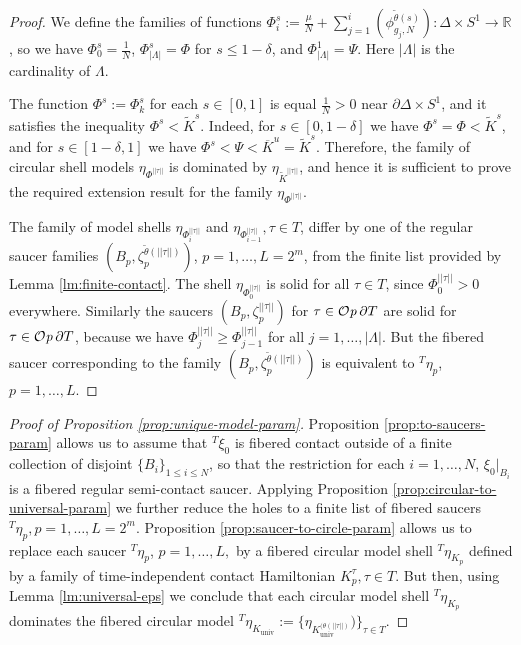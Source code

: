 \documentclass[12pt]{paper}
\theoremstyle{plain}
\theoremstyle{definition}
\newcommand{\wt}{\widetilde}
\newcommand{\ol}{\overline}
\newcommand{\p}{\partial}
\newcommand{\R}{{\mathbb{R}}}
\newcommand{\univ}{\mathrm{univ}}
\def\Op{{\mathcal O}{\it p}\,}
\numberwithin{figure}{section}
\begin{document}
\begin{proof}
  We define the families of  functions $\Phi^s_i:= \frac\mu N+ 
  \sum\limits_{j=1}^i \left( \phi^{\wt{\theta}(s)}_{g_j,N}\right):\Delta\times S^1\to\R$, 
  so we have $\Phi^s_0=\frac1N$, $\Phi^s_{|\Lambda|}=\Phi$ for $s\leq 1-\delta$, and $\Phi^1_{|\Lambda|}=\Psi$. Here ${|\Lambda|}$ is the cardinality of $\Lambda$.

 The function  $\Phi^s:=\Phi^s_k$ for each $s\in[0,1]$ is equal $\frac1N>0$ near $  \p \Delta\times S^1$, and 
it satisfies the inequality $\Phi^s<\wt K^s$. Indeed, for $s\in[0,1-\delta]$ we have  $\Phi^s=\Phi<\wt K^s$, and for $s\in[1-\delta,1]$ we have
$\Phi^s<\Psi<\ol K^u=\wt K^s$.
Therefore, the  family of circular shell models $\eta_{\Phi^{||\tau||}}$  is dominated by $\eta_{\wt K^{||\tau||}}$, and hence it is sufficient to prove the required extension result for the family $\eta_{\Phi^{||\tau||}}$.  

The family of   model shells $\eta_{\Phi^{||\tau||}_i}$ and 
 $\eta_{\Phi^{||\tau||}_{i-1}}, \tau\in T$, differ by one of  the regular saucer families    $(B_p,\zeta^{\wt\theta(||\tau||)}_p)$, $p=1,\dots, L=2^m$, from the finite list provided by Lemma \ref{lm:finite-contact}.   The   shell $\eta_{\Phi^{||\tau||}_0}$ is solid  for all $\tau\in T$, since $\Phi^{||\tau||}_0>0$ everywhere. Similarly the saucers  $(B_p,\zeta^{||\tau||}_p)$
 for $\tau\in\Op\p T$ are solid   for $\tau\in\Op\p T$, because we have  $\Phi^{||\tau||}_j\geq\Phi^{||\tau||}_{j-1}$ for all $j=1,\dots, |\Lambda|$.  
But the fibered saucer  corresponding to the family  $(B_p,\zeta^{\wt\theta(||\tau||)}_p)$ is equivalent to  ${}^T\eta_p$, $p=1,\dots, L$.
    \end{proof}

   
   \medskip
  
   \begin{proof}[Proof of Proposition \ref{prop:unique-model-param}]
 Proposition  \ref{prop:to-saucers-param}  allows us to   assume that ${}^T\xi_0$ is fibered  contact outside of a finite collection of disjoint    $\{B_i\}_{1\leq i\leq N}$, so that the restriction  for each $i=1,\dots, N$, $\xi_0|_{B_i}$ is a fibered  regular semi-contact saucer. Applying
Proposition \ref{prop:circular-to-universal-param} we further reduce the holes to a finite list of fibered saucers ${}^T\eta_p, p=1,\dots, L=2^m$. Proposition \ref{prop:saucer-to-circle-param} allows us to replace  each saucer ${}^T\eta_p$, $p=1,\dots, L,$ by a fibered circular model shell  ${}^T\eta_{K_p}$ defined by  a family of
  time-independent  contact Hamiltonian $K_p^\tau, \tau\in T$.
But then, using     Lemma \ref{lm:universal-eps} we conclude that each  circular model shell  ${}^T\eta_{K_p}$ dominates      the fibered    circular model   ${}^T\eta_{K_{\univ}}:=\{\eta_{K^{ (\theta(||\tau||)}_{\univ}})\}_{\tau\in T}$. 
\end{proof}
\end{document}
